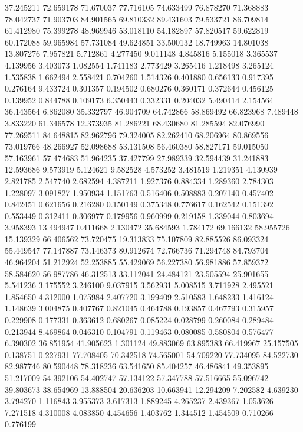 37.245211
72.659178
71.670037
77.716105
74.633499
76.878270
71.368883
78.042737
71.903703
84.901565
69.810332
89.431603
79.533721
86.709814
61.412980
75.399278
48.969946
53.018110
54.182897
57.820517
59.622819
60.172088
59.965984
57.731084
49.624851
33.500132
18.749963
14.801038
13.807276
7.957821
5.712861
4.277450
9.011148
4.845816
5.155018
3.365537
4.139956
3.403073
1.082554
1.741183
2.773429
3.265416
1.218498
3.265124
1.535838
1.662494
2.558421
0.704260
1.514326
0.401880
0.656133
0.917395
0.276164
9.433724
0.301357
0.194502
0.680276
0.360171
0.372644
0.456125
0.139952
0.844788
0.109173
6.350443
0.332331
0.204032
5.490414
2.154564
36.143564
6.862080
35.332797
46.904709
64.742866
58.869492
66.823968
7.489448
3.833220
61.346578
12.373935
81.286221
68.430680
81.285594
82.076990
77.269511
84.648815
82.962796
79.324005
82.262410
68.206964
80.869556
73.019766
48.266927
52.098688
53.131508
56.460380
58.827171
59.015050
57.163961
57.474683
51.964235
37.427799
27.989339
32.594439
31.241883
12.593686
9.573919
5.124621
9.582528
4.573252
3.481519
1.219351
4.130939
2.821785
2.547740
2.682594
4.387211
1.927376
0.884334
1.289360
2.784303
1.228097
3.091827
1.950934
1.151763
0.516406
0.508883
0.207140
0.457402
0.842451
0.621656
0.216280
0.150149
0.375348
0.776617
0.162542
0.151392
0.553449
0.312411
0.306977
0.179956
0.960999
0.219158
1.339044
0.803694
3.958393
13.494947
0.411668
2.130472
35.684593
1.784172
69.166132
58.955726
15.139329
66.406562
73.720475
19.313833
75.107809
82.885526
86.093324
55.449547
77.147887
73.146373
80.912674
72.766736
71.294748
84.793704
46.964204
51.212924
52.253885
55.429069
56.227380
56.981886
57.859372
58.584620
56.987786
46.312513
33.112041
24.484121
23.505594
25.901655
5.541236
3.175552
3.246100
9.037915
3.562931
5.008515
3.711928
2.495521
1.854650
4.312000
1.075984
2.407720
3.199409
2.510583
1.648233
1.416124
1.148639
3.004875
0.407767
0.821045
0.464788
0.193857
0.467793
0.315957
0.229908
0.177331
0.363612
0.680267
0.085224
0.028799
0.260084
0.289484
0.213944
8.469864
0.046310
0.104791
0.119463
0.080085
0.580804
0.576477
6.390302
36.851954
41.905623
1.301124
49.883069
63.895383
66.419967
25.157505
0.138751
0.227931
77.708405
70.342518
74.565001
54.709220
77.734095
84.522730
82.987746
80.590448
78.318236
63.541650
85.404257
46.486841
49.353895
51.217009
54.392106
54.402747
57.134122
57.347788
57.516665
55.096742
39.803673
38.654969
13.888504
20.636203
10.663941
12.294209
7.202582
4.639230
3.794270
1.116843
3.955373
3.617313
1.889245
4.265237
2.439367
1.053626
7.271518
4.310008
4.083850
4.454656
1.403762
1.344512
1.454509
0.710266
0.776199
